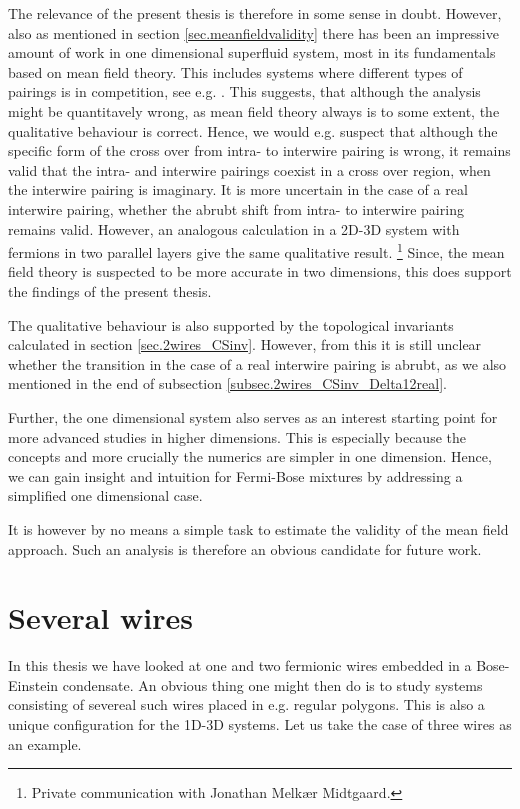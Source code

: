 The relevance of the present thesis is therefore in some sense in doubt. However, also as mentioned in section \ref{sec.meanfieldvalidity} there has been an impressive amount of work in one dimensional superfluid system, most in its fundamentals based on mean field theory. This includes systems where different types of pairings is in competition, see e.g. \cite{LiYangChen}. This suggests, that although the analysis might be quantitavely wrong, as mean field theory always is to some extent, the qualitative behaviour is correct. Hence, we would e.g. suspect that although the specific form of the cross over from intra- to interwire pairing is wrong, it remains valid that the intra- and interwire pairings coexist in a cross over region, when the interwire pairing is imaginary. It is more uncertain in the case of a real interwire pairing, whether the abrubt shift from intra- to interwire pairing remains valid. However, an analogous calculation in a 2D-3D system with fermions in two parallel layers give the same qualitative result. \footnote{Private communication with Jonathan Melk{\ae}r Midtgaard.} Since, the mean field theory is suspected to be more accurate in two dimensions, this does support the findings of the present thesis. 

The qualitative behaviour is also supported by the topological invariants calculated in section \ref{sec.2wires_CSinv}. However, from this it is still unclear whether the transition in the case of a real interwire pairing is abrubt, as we also mentioned in the end of subsection \ref{subsec.2wires_CSinv_Delta12real}. 

Further, the one dimensional system also serves as an interest starting point for more advanced studies in higher dimensions. This is especially because the concepts and more crucially the numerics are simpler in one dimension. Hence, we can gain insight and intuition for Fermi-Bose mixtures by addressing a simplified one dimensional case. 

It is however by no means a simple task to estimate the validity of the mean field approach. Such an analysis is therefore an obvious candidate for future work.

\section{Several wires}
In this thesis we have looked at one and two fermionic wires embedded in a Bose-Einstein condensate. An obvious thing one might then do is to study systems consisting of severeal such wires placed in e.g. regular polygons. This is also a unique configuration for the 1D-3D systems. Let us take the case of three wires as an example. 

